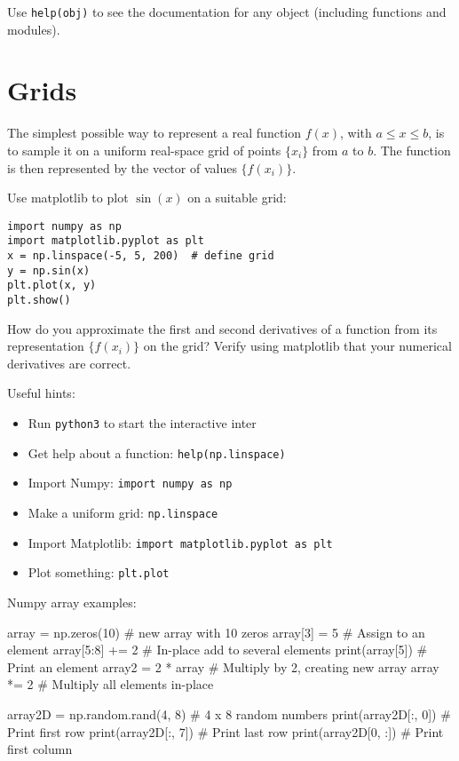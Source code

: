 \documentclass{article}
\newcommand{\exercise}[1]{
  \bigskip
  \begin{boxedminipage}[c]{0.8\linewidth}
  #1
  \end{boxedminipage}
  \bigskip
}
\begin{document}
Use \lstinline{help(obj)} to see the documentation for any object
(including functions and modules).

\section{Grids}
The simplest possible way to represent a real function $f(x)$,
with $a \le x \le b$, is to
sample it on a uniform real-space grid of points $\{x_i\}$ from $a$ to $b$.
The function is then represented by the vector of values $\{f(x_i)\}$.

Use matplotlib to plot $\sin(x)$ on a suitable grid:

\begin{lstlisting}
import numpy as np
import matplotlib.pyplot as plt
x = np.linspace(-5, 5, 200)  # define grid
y = np.sin(x)
plt.plot(x, y)
plt.show()
\end{lstlisting}

\exercise{
How do you approximate the first and second derivatives of a function from
its representation $\{f(x_i)\}$ on the grid?  Verify using matplotlib that your
numerical derivatives are correct.
}

Useful hints:

\begin{itemize}
\item Run \texttt{python3} to start the interactive inter
\item Get help about a function: \texttt{help(np.linspace)}
\item Import Numpy: \texttt{import numpy as np}
\item Make a uniform grid: \texttt{np.linspace}
\item Import Matplotlib: \texttt{import matplotlib.pyplot as plt}
\item Plot something: \texttt{plt.plot}
\end{itemize}

Numpy array examples:
\begin{lstinline}
array = np.zeros(10)  # new array with 10 zeros
array[3] = 5  # Assign to an element
array[5:8] += 2  # In-place add to several elements
print(array[5])  # Print an element
array2 = 2 * array  # Multiply by 2, creating new array
array *= 2  # Multiply all elements in-place

array2D = np.random.rand(4, 8)  # 4 x 8 random numbers
print(array2D[:, 0])  # Print first row
print(array2D[:, 7])  # Print last row
print(array2D[0, :])  # Print first column
\end{lstinline}
\end{document}

